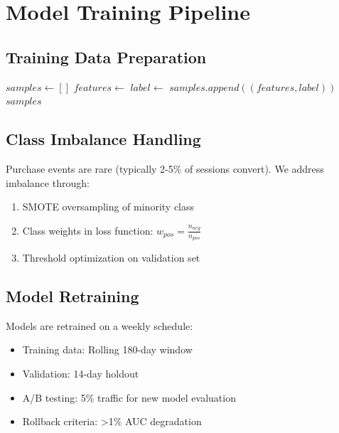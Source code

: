\section{Model Training Pipeline}


\subsection{Training Data Preparation}

\begin{algorithm}
\caption{Training Data Generation}
\begin{algorithmic}[1]
    \State $samples \gets []$
            \State $features \gets$ 
            \State $label \gets$ 
            \State $samples.append((features, label))$
        \EndFor
    \EndFor
    \State \Return $samples$
\EndFunction
\end{algorithmic}
\end{algorithm}

\subsection{Class Imbalance Handling}

Purchase events are rare (typically 2-5\% of sessions convert). We address imbalance through:

\begin{enumerate}
    \item SMOTE oversampling of minority class
    \item Class weights in loss function: $w_{pos} = \frac{n_{neg}}{n_{pos}}$
    \item Threshold optimization on validation set
\end{enumerate}

\subsection{Model Retraining}

Models are retrained on a weekly schedule:

\begin{itemize}
    \item Training data: Rolling 180-day window
    \item Validation: 14-day holdout
    \item A/B testing: 5\% traffic for new model evaluation
    \item Rollback criteria: >1\% AUC degradation
\end{itemize}

